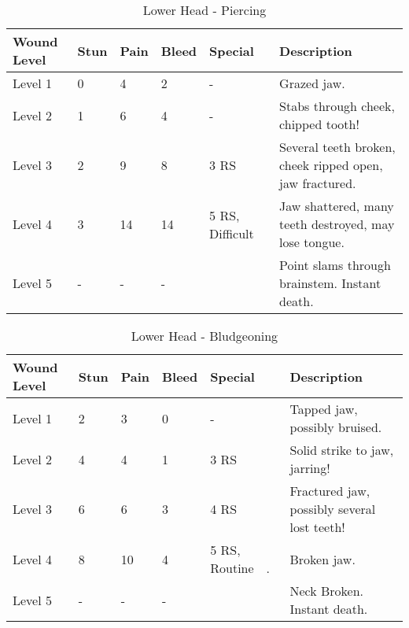 \documentclass[oneside,11pt,english]{book}
\begin{document}
\begin{table}[hb] %
	\caption{Lower Head - Piercing}
	\label{wound:Lower Head - Piercing}
	\begin{tabu} to 
Wound Level &Stun &Pain &Bleed &Special &Description\\\toprule
Level 1& 0& 4& 2& - &Grazed jaw.\\
Level 2& 1& 6& 4& - &Stabs through cheek, chipped tooth!\\
Level 3& 2& 9& 8&  3 RS &Several teeth broken, cheek ripped open, jaw fractured.\\
Level 4& 3& 14& 14
	& 5 RS,\newline
	Difficult~ 
&Jaw shattered, many teeth destroyed, may lose tongue.\\
Level 5& - &- &- && Point slams through brainstem. Instant death.\\
	\end{tabu}
\end{table}

\begin{table}[hb] %
	\caption{Lower Head - Bludgeoning}
	\label{wound:Lower Head - Bludgeoning}
	\begin{tabu} to 
Wound Level &Stun &Pain &Bleed &Special &Description\\\toprule
Level 1& 2& 3& 0& - &Tapped jaw, possibly bruised.\\
Level 2& 4& 4& 1&  3 RS &Solid strike to jaw, jarring!\\
Level 3& 6& 6& 3&  4 RS &Fractured jaw, possibly several lost teeth! \\
Level 4& 8& 10&4
	& 5 RS,\newline
		Routine~~.
	&Broken jaw.\\
Level 5& - &- &- && Neck Broken. Instant death.\\
	\end{tabu}
\end{table}
\end{document}
